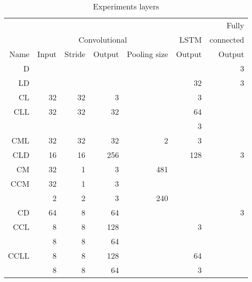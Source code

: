 \begin{table*}[!ht]
    \centering
    \caption{Experiments layers}
    \label{tab:carvinglayers}
\begin{tabular}{r|r|r|r|r|r|r}

       & \multicolumn{4}{|c|}{}                         &        & Fully           \\     
       & \multicolumn{4}{|c|}{Convolutional}            & LSTM   &       connected \\ \hline
Name   & Input         & Stride & Output & Pooling size & Output & Output          \\ \hline\hline

D      &               &        &        &              &        & 3               \\ \hline
LD     &               &        &        &              & 32     & 3               \\ \hline
CL     & 32            & 32     & 3      &              & 3      &                 \\ \hline
\hline
CLL    & 32            & 32     & 32     &              & 64     &                 \\       
       &               &        &        &              & 3      &                 \\ \hline
CML    & 32            & 32     & 32     & 2            & 3      &                 \\ \hline
CLD    & 16            & 16     & 256    &              & 128    & 3               \\ \hline
\hline
CM     & 32            & 1      & 3      & 481          &        &                 \\ \hline
CCM    & 32            & 1      & 3      &              &        &                 \\       
       & 2             & 2      & 3      & 240          &        &                 \\ \hline
CD     & 64            & 8      & 64     &              &        & 3               \\ \hline
\hline
CCL    & 8             & 8      & 128    &              & 3      &                 \\       
       & 8             & 8      & 64     &              &        &                 \\ \hline
CCLL   & 8             & 8      & 128    &              & 64     &                 \\       
       & 8             & 8      & 64     &              & 3      &                 \\ \hline


\end{tabular}
\end{table*}
